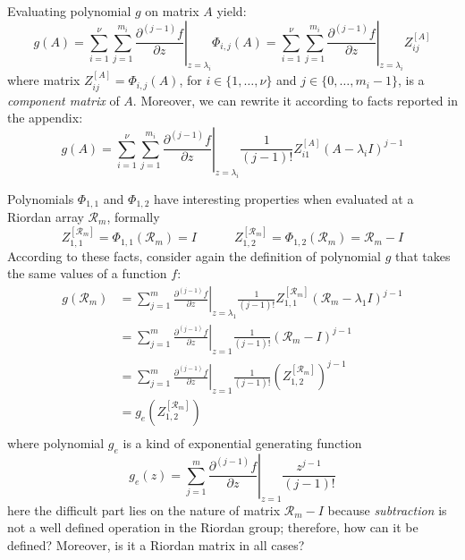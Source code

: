 
Evaluating polynomial $g$ on matrix $A$ yield:
\begin{displaymath}
g(A) = \sum_{i=1}^{\nu}{\sum_{j=1}^{m_{i}}{ \left.  \frac{\partial^{(j-1)}{f}}{\partial{z}} \right|_{z=\lambda_{i}}\Phi_{i,j}(A) }}
     = \sum_{i=1}^{\nu}{\sum_{j=1}^{m_{i}}{ \left.  \frac{\partial^{(j-1)}{f}}{\partial{z}} \right|_{z=\lambda_{i}}Z_{ij}^{[A]} }}
\end{displaymath}
where matrix $Z_{ij}^{[A]}=\Phi_{i,j}(A)$, for $i\in \lbrace 1, \ldots, \nu \rbrace$
and $j \in \lbrace 0, \ldots, m_{i}-1 \rbrace$, is a \textit{component matrix}
of $A$. Moreover, we can rewrite it according to facts reported in the appendix:
\begin{displaymath}
g(A) = \sum_{i=1}^{\nu}{\sum_{j=1}^{m_{i}}{ \left.  \frac{\partial^{(j-1)}{f}}{\partial{z}} \right|_{z=\lambda_{i}}\frac{1}{(j-1)!}{Z_{i1}^{[A]}(A-\lambda_{i}I)^{j-1}} }}
\end{displaymath}

Polynomials $\Phi_{ 1, 1 }$ and $\Phi_{ 1, 2 }$ have interesting properties
when evaluated at a Riordan array $\mathcal{R}_{m}$, formally
\begin{displaymath}
 Z_{1,1}^{[\mathcal{R}_{m}]} = \Phi_{ 1, 1 }{\left (\mathcal{R}_{m} \right )} = I \quad\quad\quad
 Z_{1,2}^{[\mathcal{R}_{m}]} = \Phi_{ 1, 2 }{\left (\mathcal{R}_{m} \right )} = \mathcal{R}_{m} - I
\end{displaymath}
According to these facts, consider again the definition of polynomial $g$ that takes the same values of a function $f$:
\begin{displaymath}
\begin{split}
    g(\mathcal{R}_{m}) &= \sum_{j=1}^{m}{ \left. \frac{\partial^{(j-1)}{f}}{\partial{z}} \right|_{z=\lambda_{1}}\frac{1}{(j-1)!}{Z_{1,1}^{[\mathcal{R}_{m}]} (\mathcal{R}_{m}-\lambda_{1}I)^{j-1}} }\\
                       &= \sum_{j=1}^{m}{ \left. \frac{\partial^{(j-1)}{f}}{\partial{z}} \right|_{z=1}\frac{1}{(j-1)!}{(\mathcal{R}_{m}-I)^{j-1}} }\\
                       &= \sum_{j=1}^{m}{ \left. \frac{\partial^{(j-1)}{f}}{\partial{z}} \right|_{z=1}\frac{1}{(j-1)!}{\left(Z_{1,2}^{[\mathcal{R}_{m}]}\right)^{j-1}} }\\
                       &= g_{e}\left(Z_{1,2}^{[\mathcal{R}_{m}]}\right)\\
\end{split}
\end{displaymath}
where polynomial $g_{e}$ is a kind of exponential generating function
\begin{displaymath}
    g_{e}\left(z\right) = \sum_{j=1}^{m}{ \left. \frac{\partial^{(j-1)}{f}}{\partial{z}} \right|_{z=1}\frac{z^{j-1}}{(j-1)!}}
\end{displaymath}
here the difficult part lies on the nature of matrix $\mathcal{R}_{m}-I$
because \textit{subtraction} is not a well defined operation in the Riordan
group; therefore, how can it be defined?  Moreover, is it a Riordan matrix in
all cases?
